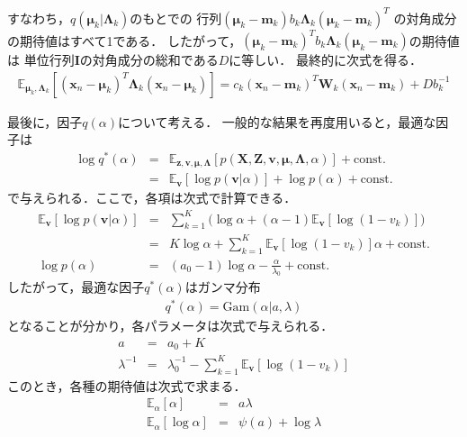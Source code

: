 すなわち，$q(\bm\mu_{k}|\bm\Lambda_{k})$のもとでの
行列$\left(\bm\mu_{k} - \bm{m}_{k}\right)
b_{k} \bm\Lambda_{k}
\left(\bm\mu_{k} - \bm{m}_{k}\right)^T$
の対角成分の期待値はすべて1である．
したがって，$\left(\bm\mu_{k} - \bm{m}_{k}\right)^T
b_{k} \bm\Lambda_{k}
\left(\bm\mu_{k} - \bm{m}_{k}\right)$の期待値は
単位行列$\bm{I}$の対角成分の総和である$D$に等しい．
最終的に次式を得る．
\begin{eqnarray}
 \mathbb{E}_{\bm\mu_{k},\bm\Lambda_{k}}
  \left[
  \left(\bm{x}_n - \bm\mu_{k}\right)^T
  \bm\Lambda_{k}
  \left(\bm{x}_n - \bm\mu_{k}\right)\right]
= c_{k} \left(\bm{x}_n - \bm{m}_{k}\right)^T
\bm{W}_{k}
\left(\bm{x}_n - \bm{m}_{k}\right)
+ D b_{k}^{-1}
\label{eq:mulambda}
\end{eqnarray}

最後に，因子$q(\alpha)$について考える．
一般的な結果を再度用いると，最適な因子は
\begin{eqnarray}
 \log q^*(\alpha)
 &=&
 \mathbb{E}_{\bm{z},\bm{v},\bm\mu,\bm\Lambda}
 \left[p(\bm{X},\bm{Z},\bm{v},\bm\mu,\bm\Lambda,\alpha)\right]
 + \mbox{const.} 
 \nonumber \\
 &=& 
 \mathbb{E}_{\bm{v}}
 \left[\log p(\bm{v}|\alpha)\right] + \log p(\alpha)
 + \mbox{const.} 
\end{eqnarray}
で与えられる．ここで，各項は次式で計算できる．
\begin{eqnarray}
\mathbb{E}_{\bm{v}}\left[\log p(\bm{v}|\alpha)\right]
&=& \sum_{k=1}^{K} \bigl(\log\alpha + (\alpha - 1)\mathbb{E}_{\bm{v}}\left[\log(1 - v_k)\right]\bigr)
\nonumber\\
&=& K \log\alpha + \sum_{k=1}^{K}\mathbb{E}_{\bm{v}}\left[\log(1 - v_k)\right] \alpha 
 + \mbox{const.} 
\nonumber\\
\log p(\alpha)
&=& (a_0 - 1) \log\alpha - \frac{\alpha}{\lambda_0} + \mbox{const.} 
\end{eqnarray}
したがって，最適な因子$q^*(\alpha)$はガンマ分布
\begin{eqnarray}
 q^*(\alpha) = \mbox{Gam}(\alpha|a, \lambda)
\end{eqnarray}
となることが分かり，各パラメータは次式で与えられる．
\begin{eqnarray}
 a &=& a_0 + K \\
 \lambda^{-1} &=& \lambda_0^{-1} 
  - \sum_{k=1}^{K}\mathbb{E}_{\bm{v}}\left[\log(1 - v_k)\right]
\end{eqnarray}
このとき，各種の期待値は次式で求まる．
\begin{eqnarray}
 \mathbb{E}_{\alpha}[\alpha] &=& a \lambda \label{eq:ea}  \\
 \mathbb{E}_{\alpha}[\log\alpha] &=& \psi(a) + \log\lambda \label{eq:ela} 
\end{eqnarray}


